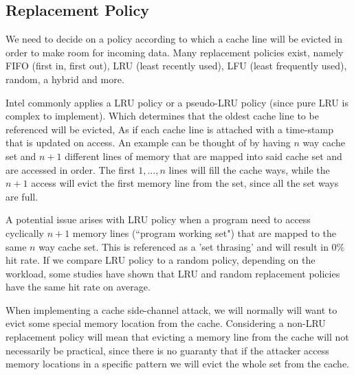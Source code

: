 \subsection{Replacement Policy} 
\label{subsec:replacementpolicy}
We need to decide on a policy according to which a cache line will be evicted in
order to make room for incoming data. Many replacement policies exist, namely
FIFO (first in, first out), LRU (least recently used), LFU (least frequently
used), random, a hybrid and more.

Intel commonly applies a LRU policy or a pseudo-LRU policy (since pure LRU is
complex to implement). Which determines that the oldest cache line to be
referenced will be evicted, As if each cache line is attached with a time-stamp
that is updated on access. An example can be thought of by having $n$ way cache
set and $n+1$ different lines of memory that are mapped into said cache set and
are accessed in order. The first $1,\dots,n$ lines will fill the cache ways,
while the $n+1$ access will evict the first memory line from the set, since all
the set ways are full.  

A potential issue arises with LRU policy when a program need to access
cyclically $n+1$ memory lines (``program working set") that are mapped to the
same $n$ way cache set. This is referenced as a 'set thrasing' and will result
in $0\%$ hit rate. If we compare LRU policy to a random policy, depending on the
workload, some studies have shown that LRU and random replacement policies have
the same hit rate on average.

When implementing a cache side-channel attack, we will normally will want to
evict some special memory location from the cache. Considering a non-LRU
replacement policy will mean that evicting a memory line from the cache will not
necessarily be practical, since there is no guaranty that if the attacker access
memory locations in a specific pattern we will evict the whole set from the
cache. 
